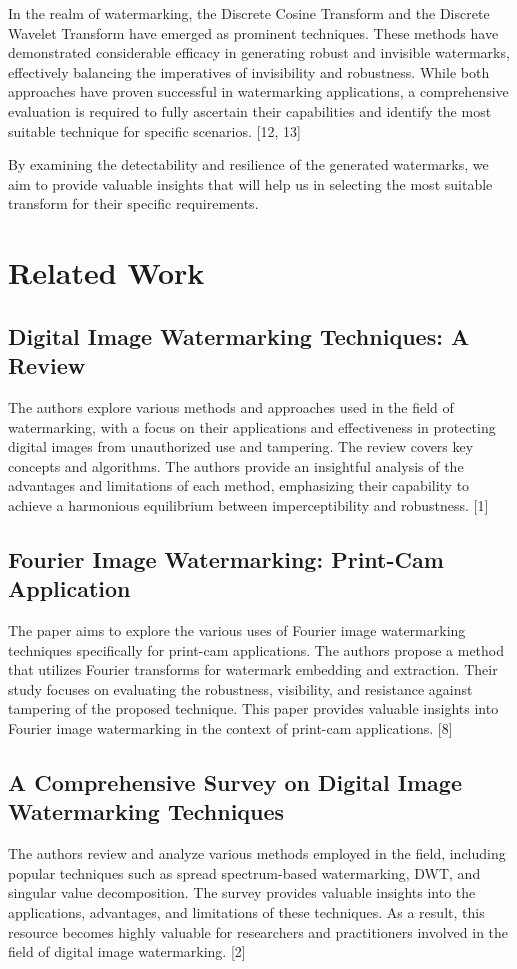 \documentclass[conference]{IEEEtran}
\begin{document}
In the realm of watermarking, the Discrete Cosine Transform and the Discrete Wavelet Transform have emerged as prominent techniques. These methods have demonstrated considerable efficacy in generating robust and invisible watermarks, effectively balancing the imperatives of invisibility and robustness. While both approaches have proven successful in watermarking applications, a comprehensive evaluation is required to fully ascertain their capabilities and identify the most suitable technique for specific scenarios. [12, 13]

By examining the detectability and resilience of the generated watermarks, we aim to provide valuable insights that will help us in selecting the most suitable transform for their specific requirements. 


\section{Related Work}

\subsection{Digital Image Watermarking Techniques: A Review}

The authors explore various methods and approaches used in the field of watermarking, with a focus on their applications and effectiveness in protecting digital images from unauthorized use and tampering. The review covers key concepts and algorithms. The authors provide an insightful analysis of the advantages and limitations of each method, emphasizing their capability to achieve a harmonious equilibrium between imperceptibility and robustness. [1]

\subsection{Fourier Image Watermarking: Print-Cam Application}
The paper aims to explore the various uses of Fourier image watermarking techniques specifically for print-cam applications. The authors propose a method that utilizes Fourier transforms for watermark embedding and extraction. Their study focuses on evaluating the robustness, visibility, and resistance against tampering of the proposed technique. This paper provides valuable insights into Fourier image watermarking in the context of print-cam applications. [8]

\subsection{A Comprehensive Survey on Digital Image Watermarking Techniques}
The authors review and analyze various methods employed in the field, including popular techniques such as spread spectrum-based watermarking, DWT, and singular value decomposition. The survey provides valuable insights into the applications, advantages, and limitations of these techniques. As a result, this resource becomes highly valuable for researchers and practitioners involved in the field of digital image watermarking. [2]
\end{document}
